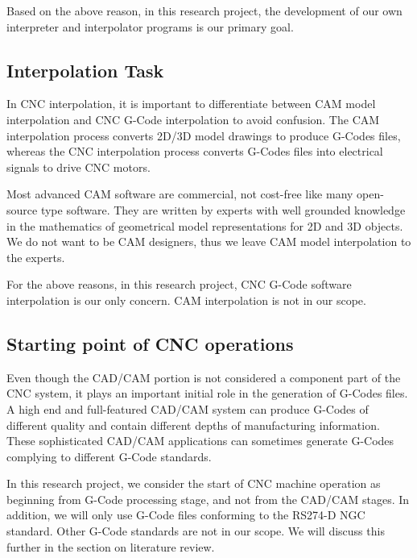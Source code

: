 \begin{tcolorbox}[colback=green!15!white,colframe=red!75!black,title=Research consideration no. 1]
\justifying	
Based on the above reason, in this research project, the development of our own interpreter and interpolator programs is our primary goal.
\end{tcolorbox}

\subsection{Interpolation Task}

In CNC interpolation, it is important to differentiate between CAM model interpolation and CNC G-Code interpolation to avoid confusion. The CAM interpolation process converts 2D/3D model drawings to produce G-Codes files, whereas the CNC interpolation process converts G-Codes files into electrical signals to drive CNC motors. 
\vspace*{1\baselineskip}

Most advanced CAM software are commercial, not cost-free like many open-source type software. They are written by experts with well grounded knowledge in the mathematics of geometrical model representations for 2D and 3D objects. We do not want to be CAM designers, thus we leave CAM model interpolation to the experts. 

\begin{tcolorbox}[colback=green!15!white, colframe=red!75!black, title=Research consideration no. 2]
\justifying
For the above reasons, in this research project, CNC G-Code software interpolation is our only concern. CAM interpolation is not in our scope.
\end{tcolorbox}

\subsection{Starting point of CNC operations}

Even though the CAD/CAM portion is not considered a component part of the CNC system, it plays an important initial role in the generation of G-Codes files. A high end and full-featured CAD/CAM system can produce G-Codes of different quality and contain different depths of manufacturing information. These sophisticated CAD/CAM applications can sometimes generate G-Codes complying to different G-Code standards.

\begin{tcolorbox}[colback=green!15!white, colframe=red!75!black, title=Research consideration no. 4]
\justifying
In this research project, we consider the start of CNC machine operation as beginning from G-Code processing stage, and not from the CAD/CAM stages. In addition, we will only use G-Code files conforming to the RS274-D NGC standard. Other G-Code standards are not in our scope. We will discuss this further in the section on literature review.
\end{tcolorbox}

